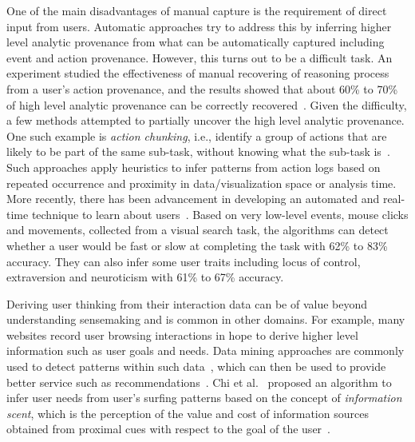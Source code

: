 One of the main disadvantages of manual capture is the requirement of direct input from users. Automatic approaches try to address this by inferring higher level analytic provenance from what can be automatically captured including event and action provenance. However, this turns out to be a difficult task. An experiment studied the effectiveness of manual recovering of reasoning process from a user's action provenance, and the results showed that about 60\% to 70\% of high level analytic provenance can be correctly recovered~\cite{Dou2009}. Given the difficulty, a few methods attempted to partially uncover the high level analytic provenance. One such example is \textit{action chunking}, i.e., identify a group of actions that are likely to be part of the same sub-task, without knowing what the sub-task is~\cite{Gotz2009}. Such approaches apply heuristics to infer patterns from action logs based on repeated occurrence and proximity in data/visualization space or analysis time. More recently, there has been advancement in developing an automated and real-time technique to learn about users~\cite{Brown2014}. Based on very low-level events, mouse clicks and movements, collected from a visual search task, the algorithms can detect whether a user would be fast or slow at completing the task with 62\% to 83\% accuracy. They can also infer some user traits including locus of control, extraversion and neuroticism with 61\% to 67\% accuracy.

Deriving user thinking from their interaction data can be of value beyond understanding sensemaking and is common in other domains. For example, many websites record user browsing interactions in hope to derive higher level information such as user goals and needs. Data mining approaches are commonly used to detect patterns within such data~\cite{Cooley1997}, which can then be used to provide better service such as recommendations~\cite{Wei2007}. Chi et al.~\cite{Chi2001} proposed an algorithm to infer user needs from user's surfing patterns based on the concept of \textit{information scent}, which is the perception of the value and cost of information sources obtained from proximal cues with respect to the goal of the user~\cite{Pirolli1999}.

